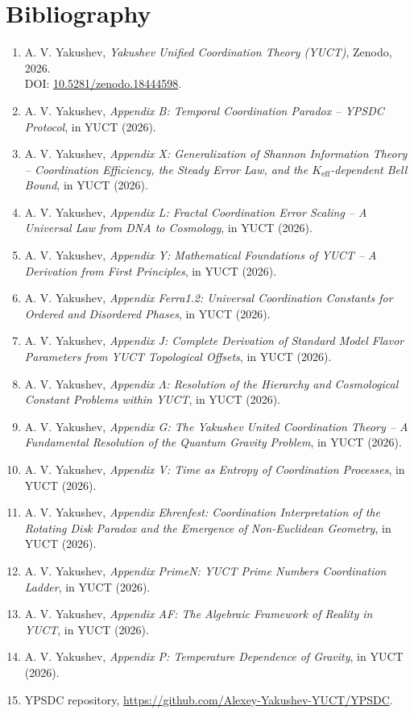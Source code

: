 \documentclass[12pt,a4paper]{article}
\begin{document}
	\section*{Bibliography}
	\begin{enumerate}
		\item A. V. Yakushev, \emph{Yakushev Unified Coordination Theory (YUCT)}, Zenodo, 2026. \\ DOI: \href{https://doi.org/10.5281/zenodo.18444598}{10.5281/zenodo.18444598}.
		\item A. V. Yakushev, \emph{Appendix B: Temporal Coordination Paradox – YPSDC Protocol}, in YUCT (2026).
		\item A. V. Yakushev, \emph{Appendix X: Generalization of Shannon Information Theory – Coordination Efficiency, the Steady Error Law, and the \(K_{\mathrm{eff}}\)-dependent Bell Bound}, in YUCT (2026).
		\item A. V. Yakushev, \emph{Appendix L: Fractal Coordination Error Scaling – A Universal Law from DNA to Cosmology}, in YUCT (2026).
		\item A. V. Yakushev, \emph{Appendix Y: Mathematical Foundations of YUCT – A Derivation from First Principles}, in YUCT (2026).
		\item A. V. Yakushev, \emph{Appendix Ferra1.2: Universal Coordination Constants for Ordered and Disordered Phases}, in YUCT (2026).
		\item A. V. Yakushev, \emph{Appendix J: Complete Derivation of Standard Model Flavor Parameters from YUCT Topological Offsets}, in YUCT (2026).
		\item A. V. Yakushev, \emph{Appendix \(\Lambda\): Resolution of the Hierarchy and Cosmological Constant Problems within YUCT}, in YUCT (2026).
		\item A. V. Yakushev, \emph{Appendix G: The Yakushev United Coordination Theory – A Fundamental Resolution of the Quantum Gravity Problem}, in YUCT (2026).
		\item A. V. Yakushev, \emph{Appendix V: Time as Entropy of Coordination Processes}, in YUCT (2026).
		\item A. V. Yakushev, \emph{Appendix Ehrenfest: Coordination Interpretation of the Rotating Disk Paradox and the Emergence of Non-Euclidean Geometry}, in YUCT (2026).
		\item A. V. Yakushev, \emph{Appendix PrimeN: YUCT Prime Numbers Coordination Ladder}, in YUCT (2026).
		\item A. V. Yakushev, \emph{Appendix AF: The Algebraic Framework of Reality in YUCT}, in YUCT (2026).
		\item A. V. Yakushev, \emph{Appendix P: Temperature Dependence of Gravity}, in YUCT (2026).
		\item YPSDC repository, \url{https://github.com/Alexey-Yakushev-YUCT/YPSDC}.
	\end{enumerate}
	
\end{document}
